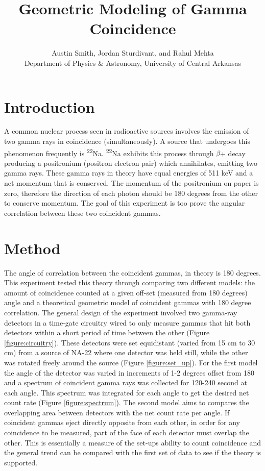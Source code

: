 \documentclass[12pt, letterpaper, twocolumn]{article}
\title{Geometric Modeling of Gamma Coincidence}
\author{Austin Smith, Jordan Sturdivant, and Rahul Mehta\\
Department of Physics \& Astronomy, University of Central Arkansas
}
\date{}
\begin{document}
\frenchspacing
\maketitle{}
\section{Introduction}
A common nuclear process seen in radioactive sources involves the emission of
two gamma rays in coincidence (simultaneously). A source that undergoes this
phenomenon frequently is \textsuperscript{22}Na. \textsuperscript{22}Na exhibits
this process through $\beta$+ decay producing a positronium (positron electron
pair) which annihilates, emitting two gamma rays. These gamma rays in theory
have equal energies of 511 keV and a net momentum that is conserved. The
momentum of the positronium on paper is zero, therefore the direction of each
photon should be 180 degrees from the other to conserve momentum. The goal of
this experiment is too prove the angular correlation between these two
coincident gammas.
\section{Method}
The angle of correlation between the coincident gammas, in theory is 180
degrees. This experiment tested this theory through comparing two different
models: the amount of coincidence counted at a given off-set (measured from
180 degrees) angle and a theoretical geometric model of coincident gammas with
180 degree correlation. The general design of the experiment involved two
gamma-ray detectors in a time-gate circuitry wired to only measure gammas that
hit both detectors within a short period of time between the other (Figure
\ref{figure:circuitry}). These detectors were set equidistant (varied from 15 cm
to 30 cm) from a source of NA-22 where one detector was held still, while the
other was rotated freely around the source (Figure \ref{figure:set_up}).
For the first model the angle of the detector was varied in increments of 1-2
degrees offset from 180 and a spectrum of coincident gamma rays was collected
for 120-240 second at each angle. This spectrum was integrated for each angle
to get the desired net count rate (Figure \ref{figure:spectrum}).
The second model aims to compares the overlapping area between detectors with
the net count rate per angle. If coincident gammas eject directly opposite from
each other, in order for any coincidence to be measured, part of the face of
each detector must overlap the other. This is essentially a measure of the
set-ups ability to count coincidence and the general trend can be compared with
the first set of data to see if the theory is supported.
\end{document}

